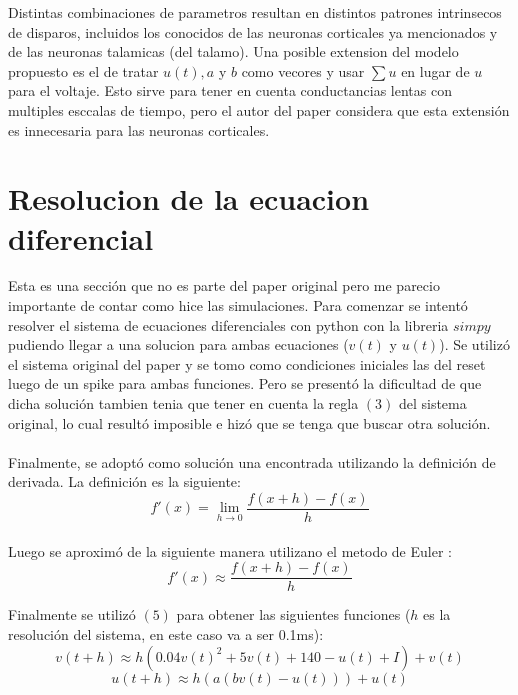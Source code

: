\documentclass[12pt]{article}
\begin{document}
Distintas combinaciones de parametros resultan en distintos patrones intrinsecos de disparos, incluidos los conocidos de las neuronas corticales ya mencionados y de las neuronas talamicas (del talamo).
Una posible extension del modelo propuesto es el de tratar $u(t), a$ y $b$ como vecores y usar $\sum{u}$ en lugar de $u$ para el voltaje. Esto sirve para tener en cuenta conductancias lentas con multiples esccalas de tiempo, pero el autor del paper considera que esta extensión es innecesaria para las neuronas corticales.

\section{Resolucion de la ecuacion diferencial}

Esta es una sección que no es parte del paper original pero me parecio importante de contar como hice las simulaciones. Para comenzar se intentó resolver el sistema de ecuaciones diferenciales con python con la libreria $simpy$ \cite{Sympy}
pudiendo llegar a una solucion para ambas
ecuaciones ($v(t)$ y $u(t)$). Se utilizó el sistema original del paper y se tomo como condiciones iniciales las del reset luego de un spike para ambas funciones.
Pero se presentó la dificultad de que dicha solución tambien tenia que tener en cuenta la regla $(3)$ del sistema original, lo cual resultó imposible e hizó que se tenga que buscar otra solución. \\ \\
Finalmente, se adoptó como solución una encontrada utilizando la definición de derivada. La definición es la siguiente: \\
\begin{equation}
    f'(x) = \lim_{h \to 0} \frac{f(x + h) - f(x)}{h}
\end{equation}
\\
Luego se aproximó de la siguiente manera utilizano el metodo de Euler \cite{Euler}:
\begin{equation}
    f'(x) \approx \frac{f(x + h) - f(x)}{h}
\end{equation}

Finalmente se utilizó $(5)$ para obtener las siguientes funciones ($h$ es la resolución del sistema, en este caso va a ser 0.1ms):
\begin{equation}
    v(t + h) \approx h(0.04 v(t)^2 + 5 v(t) + 140 - u(t) + I) + v(t)
\end{equation}
\begin{equation}
    u(t + h) \approx h(a(b v(t) - u(t))) + u(t)
\end{equation}
\end{document}
